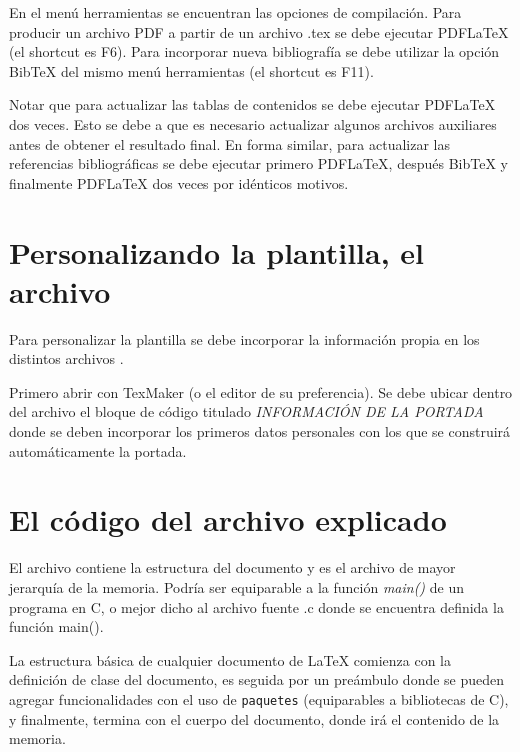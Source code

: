 En el menú herramientas se encuentran las opciones de compilación.  Para producir un archivo PDF a partir de un archivo .tex se debe ejecutar PDFLaTeX (el shortcut es F6). Para incorporar nueva bibliografía se debe utilizar la opción BibTeX del mismo menú herramientas (el shortcut es F11).

Notar que para actualizar las tablas de contenidos se debe ejecutar PDFLaTeX dos veces.  Esto se debe a que es necesario actualizar algunos archivos auxiliares antes de obtener el resultado final.  En forma similar, para actualizar las referencias bibliográficas se debe ejecutar primero PDFLaTeX, después BibTeX y finalmente PDFLaTeX dos veces por idénticos motivos.

\section{Personalizando la plantilla, el archivo }
\label{sec:FillingFile}

Para personalizar la plantilla se debe incorporar la información propia en los distintos archivos . 

Primero abrir  con TexMaker (o el editor de su preferencia). Se debe ubicar dentro del archivo el bloque de código titulado \emph{INFORMACIÓN DE LA PORTADA} donde se deben incorporar los primeros datos personales con los que se construirá automáticamente la portada.



\section{El código del archivo  explicado}

El archivo  contiene la estructura del documento y es el archivo de mayor jerarquía de la memoria.  Podría ser equiparable a la función \emph{main()} de un programa en C, o mejor dicho al archivo fuente .c donde se encuentra definida la función main().

La estructura básica de cualquier documento de \LaTeX{} comienza con la definición de clase del documento, es seguida por un preámbulo donde se pueden agregar funcionalidades con el uso de \texttt{paquetes} (equiparables a bibliotecas de C), y finalmente, termina con el cuerpo del documento, donde irá el contenido de la memoria.


